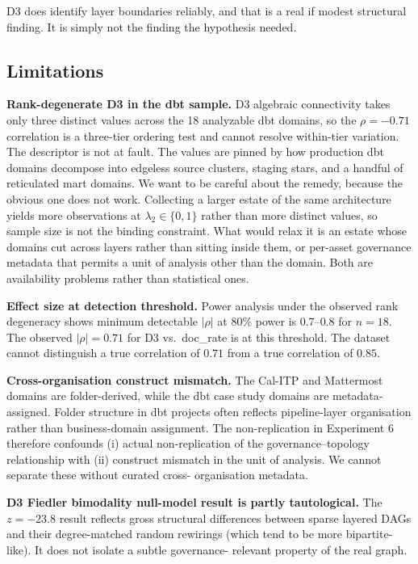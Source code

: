 \documentclass[11pt,a4paper]{article}
\begin{document}
D3 does identify layer boundaries reliably, and that is a real if modest
structural finding. It is simply not the finding the hypothesis needed.

\subsection{Limitations}

\textbf{Rank-degenerate D3 in the dbt sample.} D3 algebraic connectivity
takes only three distinct values across the 18 analyzable dbt domains,
so the $\rho = -0.71$ correlation is a three-tier ordering test and
cannot resolve within-tier variation. The descriptor is not at fault.
The values are pinned by how production dbt domains decompose into
edgeless source clusters, staging stars, and a handful of reticulated
mart domains. We want to be careful about the remedy, because the
obvious one does not work. Collecting a larger estate of the same
architecture yields more observations at $\lambda_2 \in \{0, 1\}$ rather
than more distinct values, so sample size is not the binding
constraint. What would relax it is an estate whose domains cut across
layers rather than sitting inside them, or per-asset governance metadata
that permits a unit of analysis other than the domain. Both are
availability problems rather than statistical ones.

\textbf{Effect size at detection threshold.} Power analysis under the
observed rank degeneracy shows minimum detectable $|\rho|$ at 80\% power
is $0.7$--$0.8$ for $n = 18$. The observed $|\rho| = 0.71$ for D3 vs.\
doc\_rate is at this threshold. The dataset cannot distinguish a true
correlation of $0.71$ from a true correlation of $0.85$.

\textbf{Cross-organisation construct mismatch.} The Cal-ITP and Mattermost
domains are folder-derived, while the dbt case study domains are metadata-
assigned. Folder structure in dbt projects often reflects pipeline-layer
organisation rather than business-domain assignment. The non-replication
in Experiment 6 therefore confounds (i) actual non-replication of the
governance--topology relationship with (ii) construct mismatch in the
unit of analysis. We cannot separate these without curated cross-
organisation metadata.

\textbf{D3 Fiedler bimodality null-model result is partly tautological.}
The $z = -23.8$ result reflects gross structural differences between
sparse layered DAGs and their degree-matched random rewirings (which tend
to be more bipartite-like). It does not isolate a subtle governance-
relevant property of the real graph.
\end{document}
